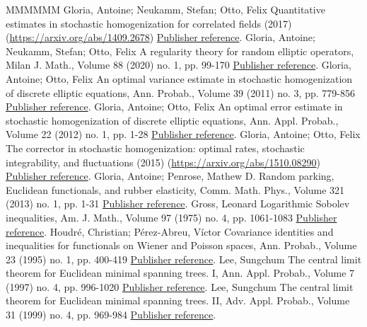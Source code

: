 \documentclass[11pt]{article}
\theoremstyle{definition}
\numberwithin{equation}{section}
\numberwithin{figure}{section}
\numberwithin{table}{section}
\begin{document}
\begin{thebibliography}{MMMMMM}
 Gloria, Antoine; Neukamm, Stefan; Otto, Felix Quantitative estimates in stochastic homogenization for correlated fields (2017) (\url{https://arxiv.org/abs/1409.2678}) \href{https://ahl.centre-mersenne.org/item/AHL_2020__3__825_0/#GNO-quant}{Publisher reference}.
 Gloria, Antoine; Neukamm, Stefan; Otto, Felix A regularity theory for random elliptic operators, Milan J. Math., Volume 88 (2020) no. 1, pp. 99-170 \href{https://ahl.centre-mersenne.org/item/AHL_2020__3__825_0/#GNO-reg}{Publisher reference}.
 Gloria, Antoine; Otto, Felix An optimal variance estimate in stochastic homogenization of discrete elliptic equations, Ann. Probab., Volume 39 (2011) no. 3, pp. 779-856 \href{https://ahl.centre-mersenne.org/item/AHL_2020__3__825_0/#Glotto-11}{Publisher reference}.
 Gloria, Antoine; Otto, Felix An optimal error estimate in stochastic homogenization of discrete elliptic equations, Ann. Appl. Probab., Volume 22 (2012) no. 1, pp. 1-28 \href{https://ahl.centre-mersenne.org/item/AHL_2020__3__825_0/#Glotto-12}{Publisher reference}.
 Gloria, Antoine; Otto, Felix The corrector in stochastic homogenization: optimal rates, stochastic integrability, and fluctuations (2015) (\url{https://arxiv.org/abs/1510.08290}) \href{https://ahl.centre-mersenne.org/item/AHL_2020__3__825_0/#GO4}{Publisher reference}.
 Gloria, Antoine; Penrose, Mathew D. Random parking, Euclidean functionals, and rubber elasticity, Comm. Math. Phys., Volume 321 (2013) no. 1, pp. 1-31 \href{https://ahl.centre-mersenne.org/item/AHL_2020__3__825_0/#Gloria-Penrose-13}{Publisher reference}.
 Gross, Leonard Logarithmic Sobolev inequalities, Am. J. Math., Volume 97 (1975) no. 4, pp. 1061-1083 \href{https://ahl.centre-mersenne.org/item/AHL_2020__3__825_0/#Gross-75}{Publisher reference}.
 Houdré, Christian; Pérez-Abreu, Víctor Covariance identities and inequalities for functionals on Wiener and Poisson spaces, Ann. Probab., Volume 23 (1995) no. 1, pp. 400-419 \href{https://ahl.centre-mersenne.org/item/AHL_2020__3__825_0/#Houdre-PerezAbreu-95}{Publisher reference}.
 Lee, Sungchum The central limit theorem for Euclidean minimal spanning trees. I, Ann. Appl. Probab., Volume 7 (1997) no. 4, pp. 996-1020 \href{https://ahl.centre-mersenne.org/item/AHL_2020__3__825_0/#Lee-97}{Publisher reference}.
 Lee, Sungchum The central limit theorem for Euclidean minimal spanning trees. II, Adv. Appl. Probab., Volume 31 (1999) no. 4, pp. 969-984 \href{https://ahl.centre-mersenne.org/item/AHL_2020__3__825_0/#Lee-99}{Publisher reference}.

\end{thebibliography}
\end{document}
